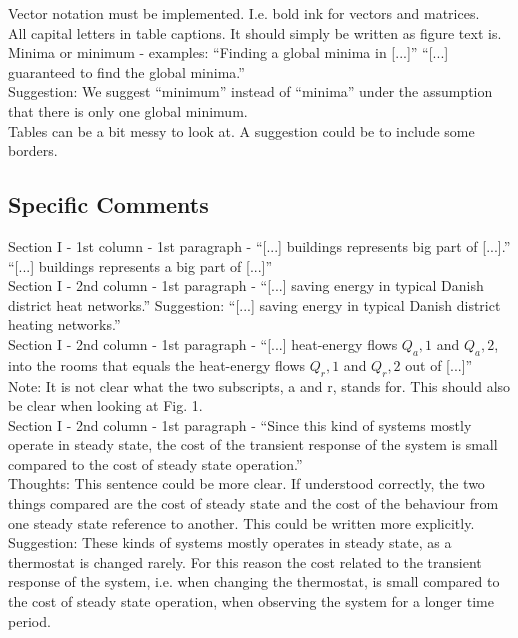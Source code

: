 \noindent Vector notation must be implemented. I.e. bold ink for vectors and matrices.\\

\noindent All capital letters in table captions. It should simply be written as figure text is.\\

\noindent Minima or minimum - examples: “Finding a global minima in [...]” “[...] guaranteed to find the global minima.”\\
Suggestion: We suggest “minimum” instead of “minima” under the assumption that there is only one global minimum. \\

\noindent Tables can be a bit messy to look at. A suggestion could be to include some borders.

\subsection{Specific Comments}

\noindent Section I - 1st column - 1st paragraph - “[...] buildings represents big part of [...].”
“[...] buildings represents a big part of [...]”\\


\noindent Section I - 2nd column - 1st paragraph - “[...] saving energy in typical Danish district heat networks.”
Suggestion: “[...] saving energy in typical Danish district heating networks.”\\


\noindent Section I - 2nd column - 1st paragraph - “[...] heat-energy flows $Q_a,1$ and $Q_a,2$, into the rooms that equals the heat-energy flows $Q_r,1$ and $Q_r,2$ out of [...]”\\
Note: It is not clear what the two subscripts, a and r, stands for. This should also be clear when looking at Fig. 1.\\


\noindent Section I - 2nd column - 1st paragraph - “Since this kind of systems mostly operate in steady state, the cost of the transient response of the system is small compared to the cost of steady state operation.”\\
Thoughts: This sentence could be more clear. If understood correctly, the two things compared are the cost of steady state and the cost of the behaviour from one steady state reference to another. This could be written more explicitly.\\ 
Suggestion: These kinds of systems mostly operates in steady state, as a thermostat is changed rarely. For this reason the cost related to the transient response of the system, i.e. when changing the thermostat, is small compared to the cost of steady state operation, when observing the system for a longer time period.\\


